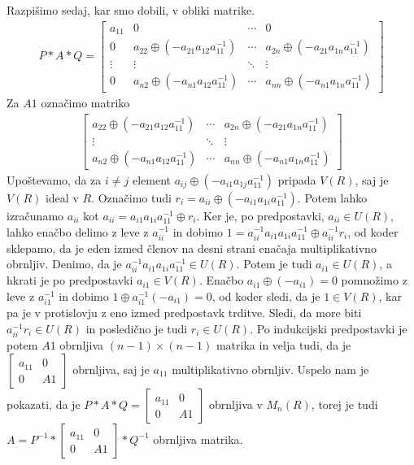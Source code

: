 \documentclass[mat1]{fmfdelo}
\begin{document}
\begin{dokaz}
	Razpišimo sedaj, kar smo dobili, v obliki matrike.
	\begin{align*}
		P*A*Q = \begin{bmatrix}
			a_{11} & 0 & \cdots & 0 \\
			0 & a_{22} \oplus (-a_{21}a_{12}a_{11}^{-1}) & \cdots & a_{2n} \oplus (-a_{21}a_{1n}a_{11}^{-1}) \\
			\vdots & \vdots & \ddots & \vdots \\
			0 & a_{n2} \oplus (-a_{n1}a_{12}a_{11}^{-1}) & \cdots & a_{nn} \oplus (-a_{n1}a_{1n}a_{11}^{-1})
		\end{bmatrix}
	\end{align*}
	Za $A1$ označimo matriko \begin{align*}
		\begin{bmatrix}
			a_{22} \oplus (-a_{21}a_{12}a_{11}^{-1}) & \cdots & a_{2n} \oplus (-a_{21}a_{1n}a_{11}^{-1}) \\
			\vdots & \ddots & \vdots \\
			a_{n2} \oplus (-a_{n1}a_{12}a_{11}^{-1}) & \cdots & a_{nn} \oplus (-a_{n1}a_{1n}a_{11}^{-1})
		\end{bmatrix}
	\end{align*}
Upoštevamo, da za $i\neq j$ element $a_{ij} \oplus (-a_{i1}a_{1j}a_{11}^{-1})$ pripada $V(R)$, saj je $V(R)$ ideal v $R$. Označimo tudi $r_i = a_{ii} \oplus (-a_{i1}a_{1i}a_{11}^{-1})$. Potem lahko izračunamo $a_{ii}$ kot $a_{ii} = a_{i1}a_{1i}a_{11}^{-1} \oplus r_i$. Ker je, po predpostavki, $a_{ii}\in U(R)$, lahko enačbo delimo z leve z $a_{ii}^{-1}$ in dobimo $1 = a_{ii}^{-1}a_{i1}a_{1i}a_{11}^{-1} \oplus a_{ii}^{-1}r_i$, od koder sklepamo, da je eden izmed členov na desni strani enačaja multiplikativno obrnljiv. Denimo, da je $a_{ii}^{-1}a_{i1}a_{1i}a_{11}^{-1}\in U(R)$. Potem je tudi $a_{i1}\in U(R)$, a hkrati je po predpostavki $a_{i1}\in V(R)$. Enačbo $a_{i1} \oplus (- a_{i1}) = 0$ pomnožimo z leve z $a_{i1}^{-1}$ in dobimo $1 \oplus a_{i1}^{-1}(-a_{i1}) = 0$, od koder sledi, da je $1\in V(R)$, kar pa je v protislovju z eno izmed predpostavk trditve. Sledi, da more biti $a_{ii}^{-1}r_i\in U(R)$ in posledično je tudi $r_i\in U(R)$. Po indukcijski predpostavki je potem $A1$ obrnljiva $(n-1)\times (n-1)$ matrika in velja tudi, da je $\begin{bmatrix}
	a_{11} & 0 \\
	0 & A1
\end{bmatrix}$ obrnljiva, saj je $a_{11}$ multiplikativno obrnljiv. Uspelo nam je pokazati, da je $P*A*Q = \begin{bmatrix}
a_{11} & 0 \\
0 & A1
\end{bmatrix}$ obrnljiva v $M_n(R)$, torej je tudi $A = P^{-1} * \begin{bmatrix}
a_{11} & 0 \\
0 & A1
\end{bmatrix} * Q^{-1}$ obrnljiva matrika.
\end{dokaz}
\end{document}
